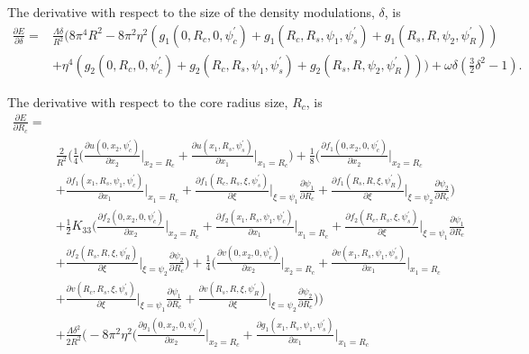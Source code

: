 \documentclass[12pt]{article}
\begin{document}
The derivative with respect to the size of the density modulations, $\delta$, is
\begin{align}
\frac{\partial E}{\partial \delta}=&\frac{\Lambda\delta}{R^2}\big(8\pi^4R^2-8\pi^2\eta^2(g_1(0,R_c,0,\psi_c^{\prime})+g_1(R_c,R_s,\psi_1,\psi_s^{\prime})+g_1(R_s,R,\psi_2,\psi_R^{\prime}))\nonumber\\
&+\eta^4(g_2(0,R_c,0,\psi_c^{\prime})+g_2(R_c,R_s,\psi_1,\psi_s^{\prime})+g_2(R_s,R,\psi_2,\psi_R^{\prime}))\big)+\omega\delta\left(\frac{3}{2}\delta^2-1\right).
\end{align}

The derivative with respect to the core radius size, $R_c$, is
\begin{align}
\frac{\partial E}{\partial R_c}=&\nonumber\\
&\frac{2}{R^2}\bigg(\frac{1}{4}\bigg(\frac{\partial u(0,x_2,\psi_c^{\prime})}{\partial x_2}\bigg|_{x_2=R_c}+\frac{\partial u(x_1,R_s,\psi_s^{\prime})}{\partial x_1}\bigg|_{x_1=R_c}\bigg)+\frac{1}{8}\bigg(\frac{\partial f_1(0,x_2,0,\psi_c^{\prime})}{\partial x_2}\bigg|_{x_2=R_c}\nonumber\\
&+\frac{\partial f_1(x_1,R_s,\psi_1,\psi_c^{\prime})}{\partial x_1}\bigg|_{x_1=R_c}+\frac{\partial f_1(R_c,R_s,\xi,\psi_s^{\prime})}{\partial \xi}\bigg|_{\xi=\psi_1}\frac{\partial \psi_1}{\partial R_c}+\frac{\partial f_1(R_s,R,\xi,\psi_R^{\prime})}{\partial \xi}\bigg|_{\xi=\psi_2}\frac{\partial \psi_2}{\partial R_c}\bigg)\nonumber\\
&+\frac{1}{2}K_{33}\bigg(\frac{\partial f_2(0,x_2,0,\psi_c^{\prime})}{\partial x_2}\bigg|_{x_2=R_c}+\frac{\partial f_2(x_1,R_s,\psi_1,\psi_c^{\prime})}{\partial x_1}\bigg|_{x_1=R_c}+\frac{\partial f_2(R_c,R_s,\xi,\psi_s^{\prime})}{\partial \xi}\bigg|_{\xi=\psi_1}\frac{\partial \psi_1}{\partial R_c}\nonumber\\
&+\frac{\partial f_2(R_s,R,\xi,\psi_R^{\prime})}{\partial \xi}\bigg|_{\xi=\psi_2}\frac{\partial \psi_2}{\partial R_c}\bigg)+\frac{1}{4}\bigg(\frac{\partial v(0,x_2,0,\psi_c^{\prime})}{\partial x_2}\bigg|_{x_2=R_c}+\frac{\partial v(x_1,R_s,\psi_1,\psi_s^{\prime})}{\partial x_1}\bigg|_{x_1=R_c}\nonumber\\
&+\frac{\partial v(R_c,R_s,\xi,\psi_s^{\prime})}{\partial \xi}\bigg|_{\xi=\psi_1}\frac{\partial\psi_1}{\partial R_c}+\frac{\partial v(R_s,R,\xi,\psi_R^{\prime})}{\partial \xi}\bigg|_{\xi=\psi_2}\frac{\partial\psi_2}{\partial R_c}\bigg)\bigg)\nonumber\\
&+\frac{\Lambda\delta^2}{2R^2}\bigg(-8\pi^2\eta^2\bigg(\frac{\partial g_1(0,x_2,0,\psi_c^{\prime})}{\partial x_2}\bigg|_{x_2=R_c}+\frac{\partial g_1(x_1,R_s,\psi_1,\psi_s^{\prime})}{\partial x_1}\bigg|_{x_1=R_c}\nonumber\\

\end{align}
\end{document}
